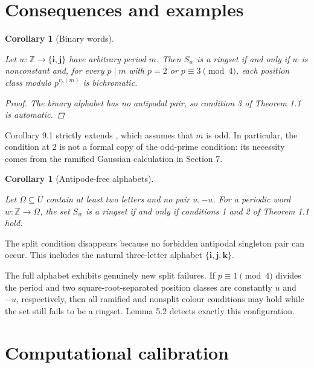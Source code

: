\documentclass[11pt]{article}
\newtheorem{corollary}[theorem]{Corollary}
\numberwithin{equation}{section}
\begin{document}
\section{Consequences and examples}


\begin{corollary}[Binary words]
\label{cor:binary}

Let $w:\mathbb Z\to\{\mathbf i,\mathbf j\}$ have arbitrary period $m$.
Then $S_w$ is a ringset if and only if $w$ is nonconstant and, for every
$p\mid m$ with $p=2$ or $p\equiv3\pmod4$, each position class modulo
$p^{v_p(m)}$ is bichromatic.

\begin{proof}

The binary alphabet has no antipodal pair, so condition 3 of Theorem 1.1 is
automatic.
\end{proof}

\end{corollary}


Corollary 9.1 strictly extends \cite{carptopus-odd}, which assumes that $m$ is odd. In
particular, the condition at $2$ is not a formal copy of the odd-prime
condition: its necessity comes from the ramified Gaussian calculation in
Section 7.

\begin{corollary}[Antipode-free alphabets]
\label{cor:antipode-free}

Let $\Omega\subseteq U$ contain at least two letters and no pair $u,-u$.
For a periodic word $w:\mathbb Z\to\Omega$, the set $S_w$ is a ringset if
and only if conditions 1 and 2 of Theorem 1.1 hold.

\end{corollary}

The split condition disappears because no forbidden antipodal singleton pair
can occur. This includes the natural three-letter alphabet
$\{\mathbf i,\mathbf j,\mathbf k\}$.

The full alphabet exhibits genuinely new split failures. If
$p\equiv1\pmod4$ divides the period and two square-root-separated position
classes are constantly $u$ and $-u$, respectively, then all ramified and
nonsplit colour conditions may hold while the set still fails to be a
ringset. Lemma 5.2 detects exactly this configuration.

\section{Computational calibration}
\end{document}
